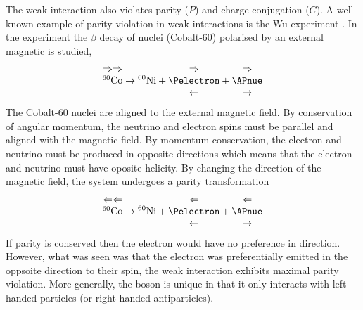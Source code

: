 The weak interaction also violates parity ($P$) and charge conjugation ($C$). A
well known example of parity violation in weak interactions is the Wu experiment
\cite{wu}. In the experiment the $\beta$ decay of nuclei (Cobalt-60) polarised by an
external magnetic is studied, 
\begin{equation}
\begin{matrix}
\Rightarrow\Rightarrow \\
^{60}\mathrm{Co} \\
~   
\end{matrix}
\to
{^{60}\mathrm{Ni}}
+
\begin{matrix}
\Rightarrow \\
\Pelectron \\
\leftarrow 
\end{matrix}
+
\begin{matrix}
\Rightarrow \\
\APnue \\
\rightarrow 
\end{matrix}
\end{equation}
The Cobalt-60 nuclei are aligned to the external magnetic field. By conservation
of angular momentum, the neutrino and electron spins must be parallel and
aligned with the magnetic field. By
momentum conservation, the electron and neutrino must be produced in opposite
directions which means that the electron and neutrino must have oposite helicity. 
By changing the direction of the magnetic field, the system undergoes a parity
transformation
\begin{equation}
\begin{matrix}
\Leftarrow\Leftarrow \\
^{60}\mathrm{Co} \\
~   
\end{matrix}
\to
{^{60}\mathrm{Ni}}
+
\begin{matrix}
\Leftarrow \\
\Pelectron \\
\leftarrow 
\end{matrix}
+
\begin{matrix}
\Leftarrow \\
\APnue \\
\rightarrow 
\end{matrix}
\end{equation}
If parity is conserved then the electron would have no preference in direction.
However, what was seen was that the electron was preferentially emitted in the
oppsoite direction to their spin, the weak interaction exhibits maximal parity
violation.
More generally, the \PWpm boson is unique in that it only interacts with left handed
particles (or right handed antiparticles).

